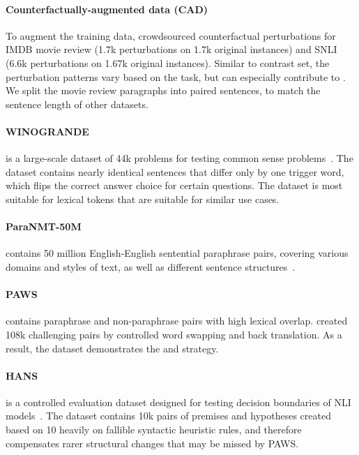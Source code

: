 \paragraph{Counterfactually-augmented data (CAD)}
To augment the training data, \citet{kaushik2019learning} crowdsourced counterfactual perturbations for IMDB movie review (1.7k perturbations on 1.7k original instances) and SNLI (6.6k perturbations on 1.67k original instances).
Similar to contrast set, the perturbation patterns vary based on the task, but can especially contribute to .
We split the movie review paragraphs into paired sentences, to match the sentence length of other datasets.


\paragraph{WINOGRANDE} is a large-scale dataset of 44k problems for testing common sense problems~\cite{sakaguchi2019winogrande}.
The dataset contains nearly identical sentences that differ only by one trigger word, which flips the correct answer choice for certain questions.
The dataset is most suitable for lexical tokens that are suitable for similar use cases.

\paragraph{ParaNMT-50M} contains 50 million English-English sentential paraphrase pairs, covering various domains and styles of text, as well as different sentence structures~\citet{wieting2017paranmt}. 

\paragraph{PAWS} contains paraphrase and non-paraphrase pairs with high lexical overlap. 
\citet{zhang2019paws} created 108k challenging pairs by controlled word swapping and back translation.
As a result, the dataset demonstrates the  and  strategy.


\paragraph{HANS} is a controlled evaluation dataset designed for testing decision boundaries of NLI models~\cite{mccoy2019right}. 
The dataset contains 10k pairs of premises and hypotheses created based on 10 heavily on fallible syntactic heuristic rules, and therefore compensates rarer structural changes that may be missed by PAWS.
